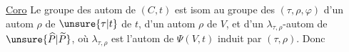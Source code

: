 \uline{Coro} Le groupe des autom de $(C,t)$  est isom au groupe des   $(\tau,\rho,\varphi)$ d'un autom $\rho$ de $\unsure{\tau|t}$ de $t$, d'un autom $\rho$ de $V$, et d'un \deleted{\unsure{$(\tau,\rho)$}} $\lambda_{\tau,\rho}$-autom de $\unsure{\widehat P|\widetilde P}$, où $\lambda_{\tau,\rho}$ est l'autom de  $\Psi(V,t)$ induit par \deleted{$(\rho,\tau)$} $(\tau,\rho)$. Donc
